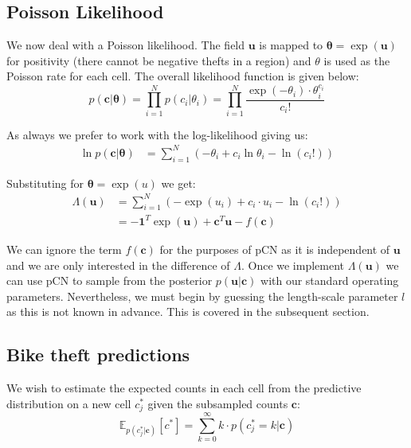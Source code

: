 \documentclass[]{article}
\newcommand{\loglik}{\Lambda}
\newcommand{\Expect}{\mathbb{E}}
\newcommand{\cbold}{\boldsymbol{c}}
\newcommand{\ubold}{\boldsymbol{u}}
\newcommand{\thetabold}{\boldsymbol{\theta}}
\begin{document}
\subsection{Poisson Likelihood}

We now deal with a Poisson likelihood. The field $\ubold$ is mapped to $\thetabold = \exp (\ubold)$ for positivity (there cannot be negative thefts in a region) and $\theta$ is used as the Poisson rate for each cell. The overall likelihood function is given below:
%
\begin{equation}
	p(\cbold | \thetabold) = \prod_{i=1}^{N} p(c_i | \theta_i)
	= \prod_{i=1}^{N} \frac{\exp (-\theta_i) \cdot \theta_i^{c_i}}{c_i!}
\end{equation}

As always we prefer to work with the log-likelihood giving us:
%
\begin{align}
	\ln p (\cbold | \thetabold) &= \sum_{i=1}^{N} \left( - \theta_i + c_i \ln \theta_i - \ln (c_i !) \right)
\end{align}

Substituting for $\thetabold = \exp (u)$ we get:
%
\begin{align}
	\loglik(\ubold) &= \sum_{i=1}^{N} \left(- 
		\exp(u_i) + c_i \cdot u_i - \ln(c_i !)
	\right) \nonumber \\
	&= - \mathbf{1}^T \exp(\ubold) + \cbold^T \ubold - f(\cbold)
	\label{eqn:log-lik-poisson}
\end{align}

We can ignore the term $f(\cbold)$ for the purposes of pCN as it is independent of $\ubold$ and we are only interested in the difference of $\loglik$. Once we implement $\loglik(\ubold)$ we can use pCN to sample from the posterior $p(\ubold | \cbold)$ with our standard operating parameters. Nevertheless, we must begin by guessing the length-scale parameter $l$ as this is not known in advance. This is covered in the subsequent section.

\subsection{Bike theft predictions}

We wish to estimate the expected counts in each cell from the predictive distribution on a new cell $c_j^*$ given the subsampled counts $\cbold$:
%
\begin{equation}
	\Expect_{p(c_j^*| \cbold)}[c^*] = \sum_{k=0}^{\infty} k \cdot p(c_j^* = k | \cbold)
	\label{eqn:c-star-expect-start}
\end{equation}
\end{document}
